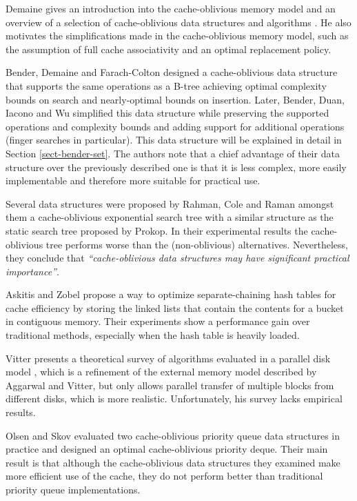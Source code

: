 \documentclass{acm_proc_article-sp}
\begin{document}
Demaine gives an introduction into the cache-oblivious memory model and an overview of a selection of cache-oblivious data structures and algorithms \cite{demaine2002coa}. He also motivates the simplifications made in the cache-oblivious memory model, such as the assumption of full cache associativity and an optimal replacement policy.

Bender, Demaine and Farach-Colton designed a cache-oblivious data structure that supports the same operations as a B-tree \cite{bender2005cob} achieving optimal complexity bounds on search and nearly-optimal bounds on insertion.
Later, Bender, Duan, Iacono and Wu simplified this data structure \cite{bender2004lpc} while preserving the supported operations and complexity bounds and adding support for additional operations (finger searches in particular).
This data structure will be explained in detail in Section \ref{sect-bender-set}.
The authors note that a chief advantage of their data structure over the
previously described one is that it is less complex, more easily implementable
and therefore more suitable for practical use.

Several data structures were proposed by Rahman, Cole and Raman \cite{rahman2001opd} amongst them a cache-oblivious exponential search tree with a similar structure as the static search tree proposed by Prokop. In their experimental results the cache-oblivious tree performs worse than the (non-oblivious) alternatives. Nevertheless, they conclude that \textit{``cache-oblivious data structures may have significant practical importance''}.

Askitis and Zobel \cite{askitis2005ccc} propose a way to optimize
separate-chaining hash tables for cache efficiency by storing the linked lists
that contain the contents for a bucket in contiguous memory. Their experiments
show a performance gain over traditional methods, especially when the hash table
is heavily loaded.

Vitter presents a theoretical survey of algorithms evaluated in a parallel disk model \cite{vitter2001ema}, which is a refinement of the external memory model described by Aggarwal and Vitter, but only allows parallel transfer of multiple blocks from different disks, which is more realistic. Unfortunately, his survey lacks empirical results.

Olsen and Skov evaluated two cache-oblivious priority queue data structures in practice \cite{olsen2002coa} and designed an optimal cache-oblivious priority deque. Their main result is that although the cache-obliv\-i\-ous data structures they examined make more efficient use of the cache, they do not perform better than traditional priority queue implementations.
\end{document}
